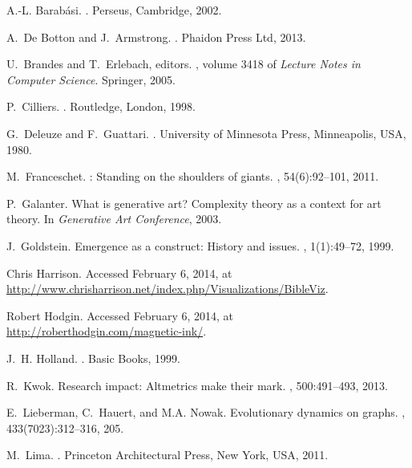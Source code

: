 \documentclass{article}
\begin{document}

\begin{thebibliography}{10}

A.-L. Barab{\'a}si.
.
\newblock Perseus, Cambridge, 2002.

A.~De Botton and J.~Armstrong.
.
\newblock Phaidon Press Ltd, 2013.

U.~Brandes and T.~Erlebach, editors.
, volume 3418 of
  {\em Lecture Notes in Computer Science}. Springer, 2005.

P.~Cilliers.
.
\newblock Routledge, London, 1998.

G.~Deleuze and F.~Guattari.
.
\newblock University of Minnesota Press, Minneapolis, USA, 1980.

M.~Franceschet.
: Standing on the shoulders of giants.
, 54(6):92--101, 2011.

P.~Galanter.
\newblock What is generative art? {C}omplexity theory as a context for art
  theory.
\newblock In {\em Generative Art Conference}, 2003.

J.~Goldstein.
\newblock Emergence as a construct: History and issues.
, 1(1):49--72, 1999.

Chris Harrison.
\newblock Accessed February 6, 2014, at
  \url{http://www.chrisharrison.net/index.php/Visualizations/BibleViz}.

Robert Hodgin.
\newblock Accessed February 6, 2014, at
  \url{http://roberthodgin.com/magnetic-ink/}.

J.~H. Holland.
.
\newblock Basic Books, 1999.

R.~Kwok.
\newblock Research impact: Altmetrics make their mark.
, 500:491--493, 2013.

E.~Lieberman, C.~Hauert, and M.A. Nowak.
\newblock Evolutionary dynamics on graphs.
, 433(7023):312--316, 205.

M.~Lima.
.
\newblock Princeton Architectural Press, New York, USA, 2011.


\end{thebibliography}
\end{document}
